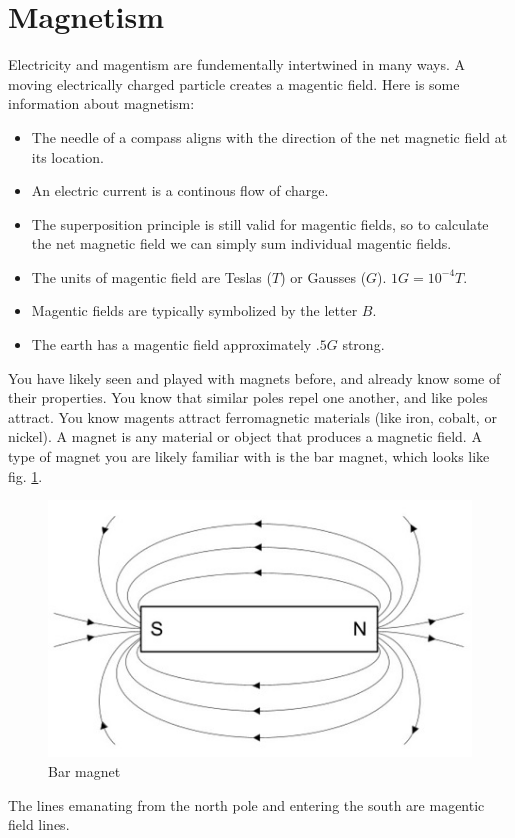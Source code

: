\documentclass[nobib]{tufte-handout}
\begin{document}
\section{Magnetism}
Electricity and magentism are fundementally intertwined in many ways. 
A moving electrically charged particle creates a magentic field.
Here is some information about magnetism: 
\begin{itemize}
    \item The needle of a compass aligns 
    with the direction of the net magnetic field at its location.
    \item An electric current is a continous flow of charge.
    \item The superposition principle is still valid for 
    magentic fields, so to calculate the net magnetic field we can 
    simply sum individual magentic fields. 
    \item The units of magentic field are Teslas ($T$) or Gausses ($G$). 
    $1 G = 10^{-4} T$. 
    \item Magentic fields are typically symbolized by the letter $B$. 
    \item The earth has a magentic field approximately $.5 G$ strong.  
\end{itemize}
You have likely seen and played with magnets before, 
and already know some of their properties. You know that similar poles 
repel one another, and like poles attract. You know magents attract ferromagnetic 
materials (like iron, cobalt, or nickel).  
A magnet is any material or object that produces a magnetic field. 
A type of magnet you are likely familiar with 
is the bar magnet, which looks like fig. \ref{fig:bar}.
\begin{figure}
    \center
    \caption{Bar magnet}
    \label{fig:bar}
    \includegraphics[width=\textwidth/2]{images/bar_magnet.jpg}
\end{figure}
The lines emanating from the north pole and entering the south 
are magentic field lines.  
\end{document}
